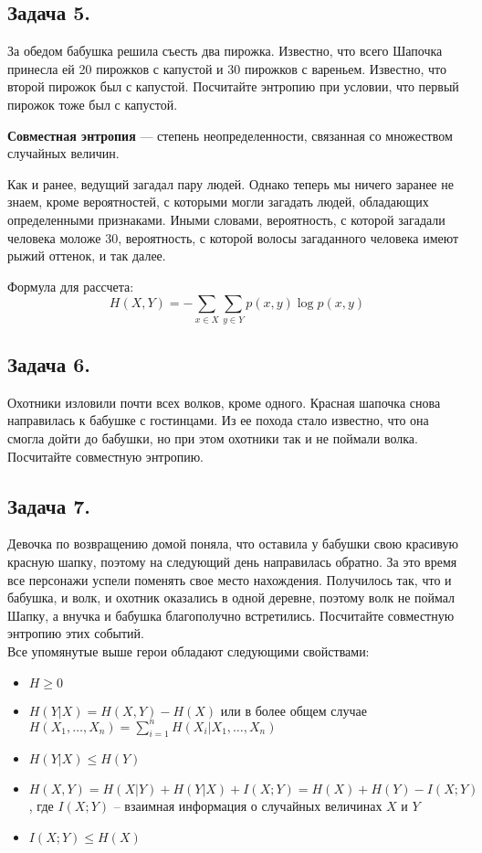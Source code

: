 \subsection*{Задача 5.} За обедом бабушка решила съесть два пирожка. Известно, что всего Шапочка принесла ей 20 пирожков с капустой и 30 пирожков с вареньем. Известно, что второй пирожок был с капустой. Посчитайте энтропию при условии, что первый пирожок тоже был с капустой.

\begin{siderules}
    \textbf{Совместная энтропия} --- степень неопределенности, связанная со множеством случайных величин.
\end{siderules}

Как и ранее, ведущий загадал пару людей. Однако теперь мы ничего заранее не знаем, кроме вероятностей, с которыми могли загадать людей, обладающих определенными признаками. Иными словами, вероятность, с которой загадали человека моложе 30, вероятность, с которой волосы загаданного человека имеют рыжий оттенок, и так далее.

Формула для рассчета:
\[H(X, Y)=-\sum\limits_{x\in X}\sum\limits_{y\in Y} p(x, y)\log p(x ,y) \]

\subsection*{Задача 6.} Охотники изловили почти всех волков, кроме одного. Красная шапочка снова направилась к бабушке с гостинцами. Из ее похода стало известно, что она смогла дойти до бабушки, но при этом охотники так и не поймали волка. Посчитайте совместную энтропию. 

\subsection*{Задача 7.} Девочка по возвращению домой поняла, что оставила у бабушки свою красивую красную шапку, поэтому на следующий день направилась обратно. За это время все персонажи успели поменять свое место нахождения. Получилось так, что и бабушка, и волк, и охотник оказались в одной деревне, поэтому волк не поймал Шапку, а внучка и бабушка благополучно встретились. Посчитайте совместную энтропию этих событий. \\

Все упомянутые выше герои обладают следующими свойствами:

\begin{itemize}
    \item $H \geqslant 0$
    \item $H(Y|X)=H(X, Y)-H(X)$ или в более общем случае $H(X_1, \ldots, X_n)=\sum\limits_{i=1}^n H(X_i|X_1, \ldots, X_n)$
    \item $H(Y|X)\leqslant H(Y)$
    \item $H(X, Y)=H(X|Y)+H(Y|X)+I(X; Y)=H(X)+H(Y)-I(X; Y)$, где $I(X; Y)$ -- взаимная информация о случайных величинах $X$ и $Y$
    \item $I(X; Y)\leqslant H(X)$
\end{itemize}

